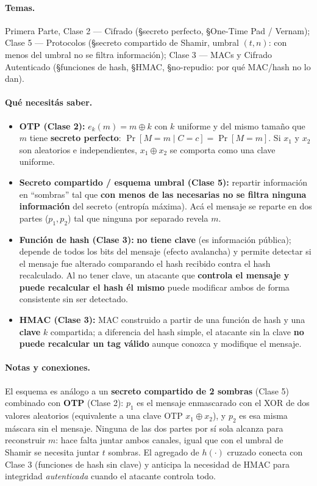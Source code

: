 \paragraph{Temas.}
Primera Parte, Clase 2 --- Cifrado (\S secreto perfecto, \S One-Time Pad / Vernam); Clase 5 ---
Protocolos (\S secreto compartido de Shamir, umbral $(t,n)$: con menos del umbral no se filtra
información); Clase 3 --- MACs y Cifrado Autenticado (\S funciones de hash, \S HMAC,
\S no-repudio: por qué MAC/hash no lo dan).

\paragraph{Qué necesitás saber.}
\begin{itemize}
  \item \textbf{OTP (Clase 2):} $e_k(m) = m \oplus k$ con $k$ uniforme y del mismo tamaño que
  $m$ tiene \textbf{secreto perfecto}: $\Pr[M{=}m\mid C{=}c] = \Pr[M{=}m]$. Si $x_1$ y $x_2$
  son aleatorios e independientes, $x_1\oplus x_2$ se comporta como una clave uniforme.
  \item \textbf{Secreto compartido / esquema umbral (Clase 5):} repartir información en
  ``sombras'' tal que \textbf{con menos de las necesarias no se filtra ninguna información}
  del secreto (entropía máxima). Acá el mensaje se reparte en dos partes ($p_1,p_2$) tal que
  ninguna por separado revela $m$.
  \item \textbf{Función de hash (Clase 3):} \textbf{no tiene clave} (es información pública);
  depende de todos los bits del mensaje (efecto avalancha) y permite detectar si el mensaje
  fue alterado comparando el hash recibido contra el hash recalculado. Al no tener clave, un
  atacante que \textbf{controla el mensaje y puede recalcular el hash él mismo} puede
  modificar ambos de forma consistente sin ser detectado.
  \item \textbf{HMAC (Clase 3):} MAC construido a partir de una función de hash y una
  \textbf{clave} $k$ compartida; a diferencia del hash simple, el atacante sin la clave
  \textbf{no puede recalcular un tag válido} aunque conozca y modifique el mensaje.
\end{itemize}

\paragraph{Notas y conexiones.}
El esquema es análogo a un \textbf{secreto compartido de 2 sombras} (Clase 5) combinado con
\textbf{OTP} (Clase 2): $p_1$ es el mensaje enmascarado con el XOR de dos valores aleatorios
(equivalente a una clave OTP $x_1\oplus x_2$), y $p_2$ es esa misma máscara sin el mensaje.
Ninguna de las dos partes por sí sola alcanza para reconstruir $m$: hace falta juntar ambos
canales, igual que con el umbral de Shamir se necesita juntar $t$ sombras. El agregado de
$h(\cdot)$ cruzado conecta con Clase 3 (funciones de hash sin clave) y anticipa la necesidad
de HMAC para integridad \emph{autenticada} cuando el atacante controla todo.

